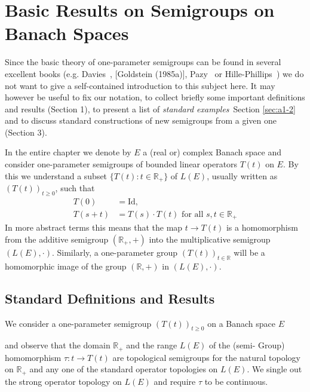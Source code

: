 

\chapter{Basic Results on Semigroups on Banach Spaces}\label{chap:a1}

Since the basic theory of one-parameter semigroups can be found in several excellent books (e.g. Davies~\cite{davies:1980}, [Goldstein (1985a)], Pazy~\cite{pazy:1983} or Hille-Phillips~\cite{hillephillips:1957}) we do not want to give a self-contained introduction to this subject here.
It may however be useful to fix our notation, to collect briefly some important definitions and results (Section 1), to present a list of \emph{standard examples}~Section \ref{sec:a1-2} %
and to discuss standard constructions of new semigroups from a given one (Section 3).

In the entire chapter we denote by $E$ a (real or) complex Banach space and consider one-parameter semigroups of bounded linear operators $T(t)$ on $E$.
By this we understand a subset $\{T(t) \colon  t \in \mathbb{R}_{+}\}$ of $L(E)$, usually written as $(T(t))_{t\geq0}$, such that
\begin{align*}
	T(0) &= \text{Id}, \\
	T(s+t) &= T(s) \cdot T(t) \text{ for all } s, t \in \mathbb{R}_{+}
\end{align*}
In more abstract terms this means that the map $t \to T(t)$ is a homomorphism from the additive semigroup $(\mathbb{R}_{+},+)$ into the multiplicative semigroup $(L(E),\cdot)$.
Similarly, a one-parameter group $(T(t))_{t\in\mathbb{R}}$ will be a homomorphic image of the group $(\mathbb{R},+)$ in $(L(E),\cdot)$.
\section{Standard Definitions and Results}\label{sec:a1-1}
We consider a one-parameter semigroup $(T(t))_{t \geq 0}$ on a Banach space $E$ 

\newpage
and observe that the domain $\mathbb{R}_{+}$ and the range $L(E)$ of the (semi-
Group) homomorphism $\tau \colon t \to T(t)$ are topological semigroups for the natural topology on $\mathbb{R}_{+}$ and any one of the standard operator topologies on $L(E)$.
We single out the strong operator topology on $L(E)$ and require $\tau$ to be continuous.


